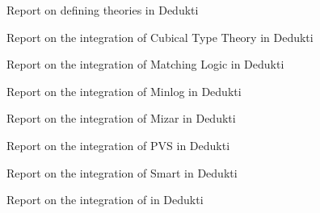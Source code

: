 \begin{workpackage}
\begin{tasklist}
\end{tasklist}

\begin{wpdelivs}
  \begin{wpdeliv}[due=18,id=wp2midterm,dissem=PU,nature=R,lead=Inr]
      {Report on defining theories in Dedukti}
  \end{wpdeliv}
  \begin{wpdeliv}[due=48,id=wp2cubical,dissem=PU,nature=R,lead=Inr]
      {Report on the integration of Cubical Type Theory in Dedukti}
  \end{wpdeliv}
  \begin{wpdeliv}[due=36,id=wp2matching,dissem=PU,nature=R,lead=Ias]
      {Report on the integration of Matching Logic in Dedukti}
  \end{wpdeliv}
  \begin{wpdeliv}[due=36,id=wp2minlog,dissem=PU,nature=R,lead=Lmu]
      {Report on the integration of Minlog in Dedukti}
  \end{wpdeliv}
  \begin{wpdeliv}[due=48,id=wp2mizar,dissem=PU,nature=R,lead=Bia]
      {Report on the integration of Mizar in Dedukti}
  \end{wpdeliv}
  \begin{wpdeliv}[due=36,id=wp2pvs,dissem=PU,nature=R,lead=Inr]
      {Report on the integration of PVS in Dedukti}
  \end{wpdeliv}
  \begin{wpdeliv}[due=36,id=wp2smart,dissem=PU,nature=R,lead=Pro]
      {Report on the integration of \textsf{Smart} in Dedukti}
  \end{wpdeliv}
  \begin{wpdeliv}[due=48,id=wp2tlaplus,dissem=PU,nature=R,lead=Inr]
      {Report on the integration of \tlaplus in Dedukti}
  \end{wpdeliv}
\end{wpdelivs}
\end{workpackage}


